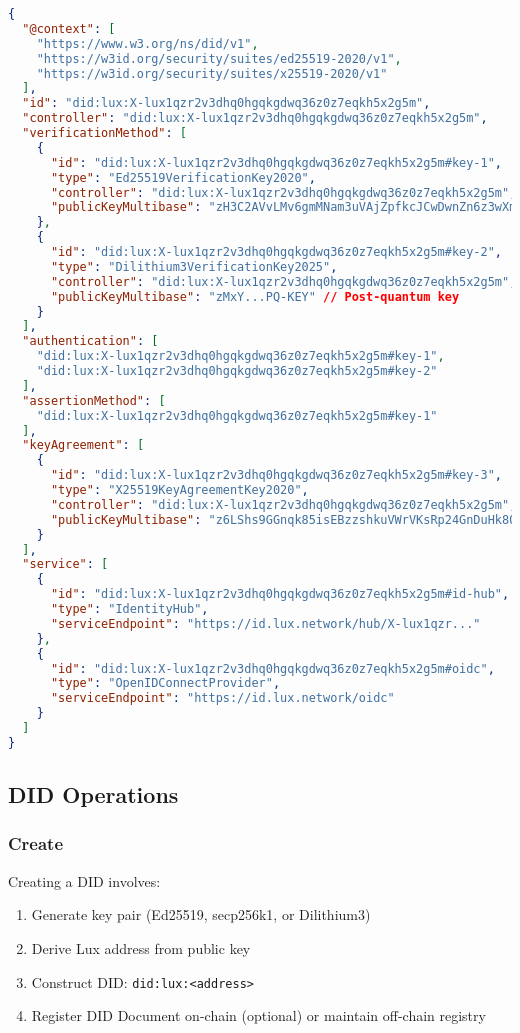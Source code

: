 \documentclass[11pt,a4paper]{article}
\begin{document}
\begin{lstlisting}[language=json, caption=Example DID Document]
{
  "@context": [
    "https://www.w3.org/ns/did/v1",
    "https://w3id.org/security/suites/ed25519-2020/v1",
    "https://w3id.org/security/suites/x25519-2020/v1"
  ],
  "id": "did:lux:X-lux1qzr2v3dhq0hgqkgdwq36z0z7eqkh5x2g5m",
  "controller": "did:lux:X-lux1qzr2v3dhq0hgqkgdwq36z0z7eqkh5x2g5m",
  "verificationMethod": [
    {
      "id": "did:lux:X-lux1qzr2v3dhq0hgqkgdwq36z0z7eqkh5x2g5m#key-1",
      "type": "Ed25519VerificationKey2020",
      "controller": "did:lux:X-lux1qzr2v3dhq0hgqkgdwq36z0z7eqkh5x2g5m",
      "publicKeyMultibase": "zH3C2AVvLMv6gmMNam3uVAjZpfkcJCwDwnZn6z3wXmqPV"
    },
    {
      "id": "did:lux:X-lux1qzr2v3dhq0hgqkgdwq36z0z7eqkh5x2g5m#key-2",
      "type": "Dilithium3VerificationKey2025",
      "controller": "did:lux:X-lux1qzr2v3dhq0hgqkgdwq36z0z7eqkh5x2g5m",
      "publicKeyMultibase": "zMxY...PQ-KEY" // Post-quantum key
    }
  ],
  "authentication": [
    "did:lux:X-lux1qzr2v3dhq0hgqkgdwq36z0z7eqkh5x2g5m#key-1",
    "did:lux:X-lux1qzr2v3dhq0hgqkgdwq36z0z7eqkh5x2g5m#key-2"
  ],
  "assertionMethod": [
    "did:lux:X-lux1qzr2v3dhq0hgqkgdwq36z0z7eqkh5x2g5m#key-1"
  ],
  "keyAgreement": [
    {
      "id": "did:lux:X-lux1qzr2v3dhq0hgqkgdwq36z0z7eqkh5x2g5m#key-3",
      "type": "X25519KeyAgreementKey2020",
      "controller": "did:lux:X-lux1qzr2v3dhq0hgqkgdwq36z0z7eqkh5x2g5m",
      "publicKeyMultibase": "z6LShs9GGnqk85isEBzzshkuVWrVKsRp24GnDuHk8QWkARMW"
    }
  ],
  "service": [
    {
      "id": "did:lux:X-lux1qzr2v3dhq0hgqkgdwq36z0z7eqkh5x2g5m#id-hub",
      "type": "IdentityHub",
      "serviceEndpoint": "https://id.lux.network/hub/X-lux1qzr..."
    },
    {
      "id": "did:lux:X-lux1qzr2v3dhq0hgqkgdwq36z0z7eqkh5x2g5m#oidc",
      "type": "OpenIDConnectProvider",
      "serviceEndpoint": "https://id.lux.network/oidc"
    }
  ]
}
\end{lstlisting}

\subsection{DID Operations}

\subsubsection{Create}

Creating a DID involves:
\begin{enumerate}
  \item Generate key pair (Ed25519, secp256k1, or Dilithium3)
  \item Derive Lux address from public key
  \item Construct DID: \texttt{did:lux:<address>}
  \item Register DID Document on-chain (optional) or maintain off-chain registry
\end{enumerate}
\end{document}
